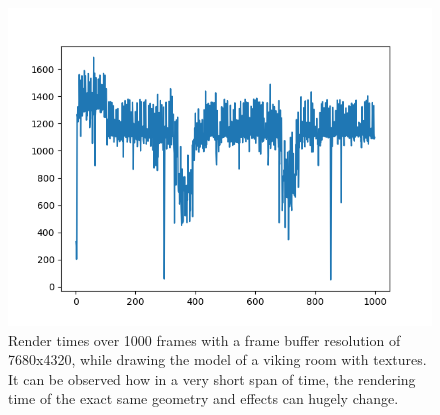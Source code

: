 \begin{figure}[hbt!]
    \centering
    \includegraphics[width=1.0\textwidth]{figuras/vulkan-7680x4320viking_room-textures-frametimes.png}
    \caption{Render times over 1000 frames with a frame buffer resolution of 7680x4320, while drawing the model of a viking room with textures. It can be observed how in a very short span of time, the rendering time of the exact same geometry and effects can hugely change.}
    \label{vulkan-7680x4320viking_room-textures-frametimes}
\end{figure}
